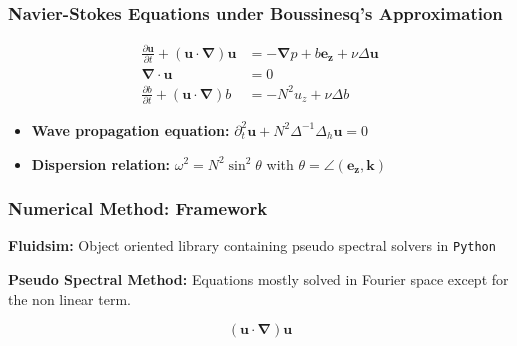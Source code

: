 \documentclass{beamer}
\newcommand{\uu}[0]{\mathbf{u}}
\newcommand{\kk}[0]{\mathbf{k}}
\newcommand{\ez}[0]{\mathbf{e_z}}
\newcommand{\bnabla}[0]{\boldsymbol{\nabla}}
\newcommand{\pd}[2]{\frac{\partial #1}{\partial #2}}
\begin{document}
\begin{frame}
\frametitle{Navier-Stokes Equations under Boussinesq's Approximation}

\begin{align*}
	\pd{\uu}{t} + \left( \uu \cdot \bnabla \right) \uu & = - \bnabla p + b \ez + \nu \Delta \uu \\
	\bnabla \cdot \uu & = 0 \\
	\pd{b}{t} + \left( \uu \cdot \bnabla \right) b & = - N^2 u_z + \nu \Delta b
\end{align*}

\quad

\begin{itemize}
\item \textbf{Wave propagation equation:} $\partial_t^2 \uu + N^2 \Delta^{-1} \Delta_h  \uu = 0$
\item \textbf{Dispersion relation:} $\omega^2 = N^2 \sin^2{\theta}$ with $\theta = \angle(\ez, \kk)$
\end{itemize}
\end{frame}


\begin{frame}
\frametitle{Numerical Method: Framework}

\textbf{Fluidsim:} Object oriented library containing pseudo spectral solvers in \texttt{Python}

\textbf{Pseudo Spectral Method:} Equations mostly solved in Fourier space except for the non linear term.

\begin{equation*}
	\left( \uu \cdot \bnabla \right) \uu
\end{equation*}

\end{frame}
\end{document}
